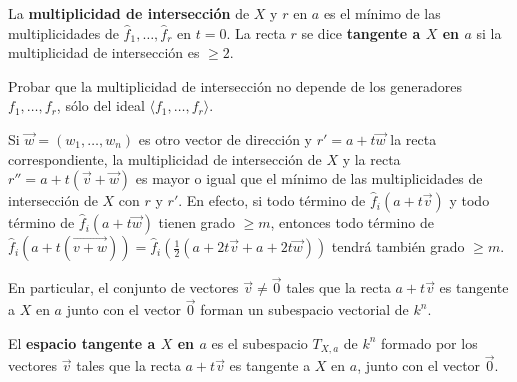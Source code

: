 \documentclass[ACGA.tex]{subfiles}
\begin{document}
\begin{defi}
 La {\bf multiplicidad de intersección} de $X$ y $r$ en $a$ es el mínimo de las multiplicidades de $\hat f_1,\ldots,\hat f_r$ en $t=0$. La recta $r$ se dice {\bf tangente a $X$ en $a$} si la multiplicidad de intersección es $\geq 2$. 
\end{defi}

\begin{ejer}
 Probar que la multiplicidad de intersección no depende de los generadores $f_1,\ldots,f_r$, sólo del ideal $\langle f_1,\ldots,f_r\rangle$.
\end{ejer}

Si $\overrightarrow w=(w_1,\ldots,w_n)$ es otro vector de dirección y $r'=a+t\overrightarrow w$ la recta correspondiente, la multiplicidad de intersección de $X$ y la recta $r''=a+t(\overrightarrow v +\overrightarrow w)$ es mayor o igual que el mínimo de las multiplicidades de intersección de $X$ con $r$ y $r'$. En efecto, si todo término de $\hat f_i(a+t\overrightarrow v)$ y todo término de $\hat f_i(a+t\overrightarrow w)$ tienen grado $\geq m$, entonces todo término de $\hat f_i(a+t(\overrightarrow{v+w}))=\hat f_i(\frac{1}{2}(a+2t\overrightarrow v+a+2t\overrightarrow w))$ tendrá también grado $\geq m$.

En particular, el conjunto de vectores $\overrightarrow v\neq\overrightarrow 0$ tales que la recta $a+t\overrightarrow v$ es tangente a $X$ en $a$ junto con el vector $\overrightarrow 0$ forman un subespacio vectorial de $k^n$.

\begin{defi}
 El {\bf espacio tangente a $X$ en $a$} es el subespacio $T_{X,a}$ de $k^n$ formado por los vectores $\overrightarrow v$ tales que la recta $a+t\overrightarrow v$ es tangente a $X$ en $a$, junto con el vector $\overrightarrow 0$.
\end{defi}
 

\end{document}
